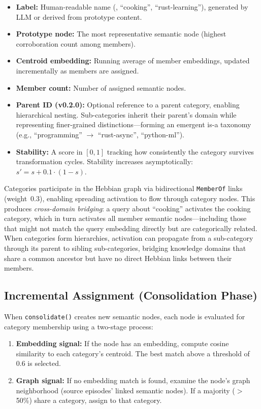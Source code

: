 \begin{itemize}[nosep]
    \item \textbf{Label:} Human-readable name (\eg, ``cooking'',
    ``rust-learning''), generated by LLM or derived from prototype content.
    \item \textbf{Prototype node:} The most representative semantic node
    (highest corroboration count among members).
    \item \textbf{Centroid embedding:} Running average of member embeddings,
    updated incrementally as members are assigned.
    \item \textbf{Member count:} Number of assigned semantic nodes.
    \item \textbf{Parent ID (v0.2.0):} Optional reference to a parent
    category, enabling hierarchical nesting. Sub-categories inherit their
    parent's domain while representing finer-grained distinctions---forming
    an emergent is-a taxonomy (e.g., ``programming'' $\rightarrow$
    ``rust-async'', ``python-ml'').
    \item \textbf{Stability:} A score in $[0, 1]$ tracking how consistently
    the category survives transformation cycles. Stability increases
    asymptotically: $s' = s + 0.1 \cdot (1 - s)$.
\end{itemize}

Categories participate in the Hebbian graph via bidirectional
\texttt{MemberOf} links (weight~0.3), enabling spreading activation to
flow through category nodes. This produces \emph{cross-domain bridging}:
a query about ``cooking'' activates the cooking category, which in turn
activates all member semantic nodes---including those that might not match
the query embedding directly but are categorically related. When categories
form hierarchies, activation can propagate from a sub-category through its
parent to sibling sub-categories, bridging knowledge domains that share a
common ancestor but have no direct Hebbian links between their members.

\subsection{Incremental Assignment (Consolidation Phase)}

When \texttt{consolidate()} creates new semantic nodes, each node is
evaluated for category membership using a two-stage process:

\begin{enumerate}[nosep]
    \item \textbf{Embedding signal:} If the node has an embedding, compute
    cosine similarity to each category's centroid. The best match above a
    threshold of 0.6 is selected.
    \item \textbf{Graph signal:} If no embedding match is found, examine the
    node's graph neighborhood (source episodes' linked semantic nodes). If a
    majority ($>$50\%) share a category, assign to that category.
\end{enumerate}

